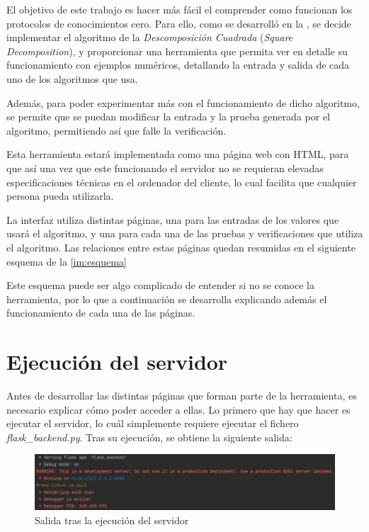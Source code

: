 El objetivo de este trabajo es hacer más fácil el comprender como funcionan los protocolos de conocimientos cero. Para ello, como se desarrolló en la , se decide implementar el algoritmo de la \emph{Descomposición Cuadrada} (\emph{Square Decomposition}), y proporcionar una herramienta que permita ver en detalle su funcionamiento con ejemplos numéricos, detallando la entrada y salida de cada uno de los algoritmos que usa.

Además, para poder experimentar más con el funcionamiento de dicho algoritmo, se permite que se puedan modificar la entrada y la prueba generada por el algoritmo, permitiendo así que falle la verificación.

Esta herramienta estará implementada como una página web con HTML, para que así una vez que este funcionando el servidor no se requieran elevadas especificaciones técnicas en el ordenador del cliente, lo cual facilita que cualquier persona pueda utilizarla.

La interfaz utiliza distintas páginas, una para las entradas de los valores que usará el algoritmo, y una para cada una de las pruebas y verificaciones que utiliza el algoritmo. Las relaciones entre estas páginas quedan resumidas en el siguiente esquema de la \autoref{im:esquema}

Este esquema puede ser algo complicado de entender si no se conoce la herramienta, por lo que a continuación se desarrolla explicando además el funcionamiento de cada una de las páginas.

\section*{Ejecución del servidor}

Antes de desarrollar las distintas páginas que forman parte de la herramienta, es necesario explicar cómo poder acceder a ellas. Lo primero que hay que hacer es ejecutar el servidor, lo cuál simplemente requiere ejecutar el fichero \emph{flask\_backend.py}. Tras su ejecución, se obtiene la siguiente salida:
\begin{figure}[H]
    \centering
    \includegraphics[width=\linewidth]{images/anexoA/server.png}
    \caption{Salida tras la ejecución del servidor}
\end{figure}

